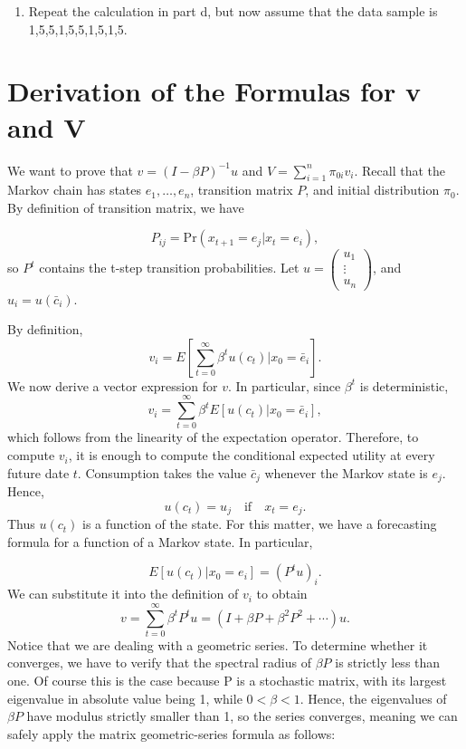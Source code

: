 \documentclass[11pt]{article}
\begin{document}
\begin{enumerate}
    \[
    \text{Prob}(M_i|\text{data})=\frac{\text{Prob}(\text{data}|M_i)\text{Prob}(M_i)}{\sum_j\text{Prob}(\text{data}|M_j)\text{Prob}(M_j)},
    \]
    where \(M_i\) denotes model \(i\) and the denominator is the unconditional probability of the data. After observing the data sample, what probabilities does the econometrician place on the two possible models?

    \item Repeat the calculation in part d, but now assume that the data sample is 1,5,5,1,5,5,1,5,1,5.

\end{enumerate}
\section*{Derivation of the Formulas for v and V}

We want to prove that \(v = (I-\beta P)^{-1}u\) and \(V = \sum_{i=1}^n\pi_{0i}v_i\). Recall that the Markov chain has states \(e_1, \dots, e_n\), transition matrix \(P\), and initial distribution \(\pi_0\). By definition of transition matrix, we have

\[
P_{ij}=\text{Pr}(x_{t+1}=e_j|x_t=e_i),
\]
so \(P^t\) contains the t-step transition probabilities.
Let \(u=\begin{pmatrix}
    u_1 \\
    \vdots \\
    u_n
\end{pmatrix}\), and \(u_i=u(\bar{c}_i)\).

By definition,
\[
v_i = E[\sum_{t=0}^\infty\beta^tu(c_t)|x_0=\bar{e}_i].
\]
We now derive a vector expression for \(v\). In particular, since \(\beta^t\) is deterministic,
\[
v_i = \sum_{t=0}^\infty\beta^tE[u(c_t)|x_0=\bar{e}_i],
\]
which follows from the linearity of the expectation operator. Therefore, to compute \(v_i\), it is enough to compute the conditional expected utility at every future date \(t\). Consumption takes the value \(\bar{c}_j\) whenever the Markov state is \(e_j\). Hence,
\[
u(c_t)=u_j \quad \text{if} \quad x_t=e_j.
\]
Thus \(u(c_t)\) is a function of the state. For this matter, we have a forecasting formula for a function of a Markov state. In particular,

\[
E[u(c_t)|x_0=e_i]= (P^tu)_i.
\]
We can substitute it into the definition of \(v_i\) to obtain
\[
v
=
\sum_{t=0}^{\infty}\beta^tP^tu
=
\left(I+\beta P+\beta^2P^2+\dotsb\right)u.
\]
Notice that we are dealing with a geometric series. To determine whether it converges, we have to verify that the spectral radius of \(\beta P\) is strictly less than one. Of course this is the case because P is a stochastic matrix, with its largest eigenvalue in absolute value being 1, while \(0<\beta<1\). Hence, the eigenvalues of \(\beta P\) have modulus strictly smaller than 1, so the series converges, meaning we can safely apply the matrix geometric-series formula as follows:
\end{document}
